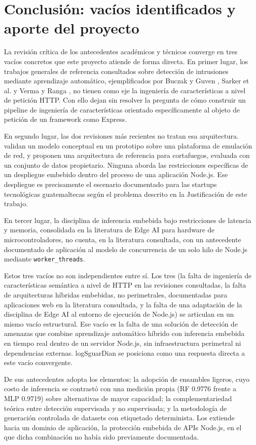 \section{Conclusión: vacíos identificados y aporte del proyecto}

La revisión crítica de los antecedentes académicos y técnicos converge en tres vacíos concretos que este proyecto atiende de forma directa. En primer lugar, los trabajos generales de referencia consultados sobre detección de intrusiones mediante aprendizaje automático, ejemplificados por Buczak y Guven \cite{buczak2016}, Sarker et al. \cite{sarker2020} y Verma y Ranga \cite{verma2020}, no tienen como eje la ingeniería de características a nivel de petición HTTP. Con ello dejan sin resolver la pregunta de cómo construir un pipeline de ingeniería de características orientado específicamente al objeto de petición de un framework como Express.

En segundo lugar, las dos revisiones más recientes no tratan esa arquitectura. \textcite{zhen2025} validan un modelo conceptual en un prototipo sobre una plataforma de emulación de red, y \textcite{rahman2026} proponen una arquitectura de referencia para cortafuegos, evaluada con un conjunto de datos propietario. Ninguna aborda las restricciones específicas de un despliegue embebido dentro del proceso de una aplicación Node.js. Ese despliegue es precisamente el escenario documentado para las startups tecnológicas guatemaltecas según el problema descrito en la Justificación de este trabajo.

En tercer lugar, la disciplina de inferencia embebida bajo restricciones de latencia y memoria, consolidada en la literatura de Edge AI para hardware de microcontroladores, no cuenta, en la literatura consultada, con un antecedente documentado de aplicación al modelo de concurrencia de un solo hilo de Node.js mediante \texttt{worker\_threads}.

Estos tres vacíos no son independientes entre sí. Los tres (la falta de ingeniería de características semántica a nivel de HTTP en las revisiones consultadas, la falta de arquitecturas híbridas embebidas, no perimetrales, documentadas para aplicaciones web en la literatura consultada, y la falta de una adaptación de la disciplina de Edge AI al entorno de ejecución de Node.js) se articulan en un mismo vacío estructural. Ese vacío es la falta de una solución de detección de amenazas que combine aprendizaje automático híbrido con inferencia embebida en tiempo real dentro de un servidor Node.js, sin infraestructura perimetral ni dependencias externas. logSguarDian se posiciona como una respuesta directa a este vacío convergente.

De sus antecedentes adopta los elementos: la adopción de ensambles ligeros, cuyo costo de inferencia se contrastó con una medición propia (RF 0.9776 frente a MLP 0.9719) sobre alternativas de mayor capacidad; la complementariedad teórica entre detección supervisada y no supervisada; y la metodología de generación controlada de datasets con etiquetado determinista. Los extiende hacia un dominio de aplicación, la protección embebida de APIs Node.js, en el que dicha combinación no había sido previamente documentada.
